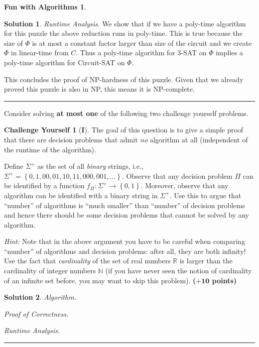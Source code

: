 \documentclass{article}
\theoremstyle{definition}
\newtheorem*{fun}{Fun with Algorithms}
\newtheorem*{challenge}{Challenge Yourself}
\def\fline{\rule{0.75\linewidth}{0.5pt}}
\newcommand{\finishline}{\begin{center}\fline\end{center}}
\newtheorem*{solution*}{Solution}
\newenvironment{solution}{\begin{solution*}}{{\finishline} \end{solution*}}
\newcommand{\grade}[1]{\hfill{\textbf{($\mathbf{#1}$ points)}}}
\newcommand{\set}[1]{\ensuremath{\left\{ #1 \right\}}}
\begin{document}
\begin{fun}
\begin{solution}
	
	\emph{Runtime Analysis.} We show that if we have a poly-time algorithm for this puzzle the above reduction runs in poly-time.  This is true because the size of $\Phi$ is at most a constant factor larger than size of the circuit and we create $\Phi$ in linear-time from $C$.  Thus a poly-time algorithm for 3-SAT on $\Phi$ implies a poly-time algorithm for Circuit-SAT on $\Phi$. 
	
	This concludes the proof of NP-hardness of this puzzle.  Given that we already proved this puzzle is also in NP, this means it is NP-complete. \\
	
\end{solution}

\end{fun}



Consider solving \textbf{at most one} of the following two challenge yourself problems. 

\bigskip

\begin{challenge}[\textbf{I}] 
	The goal of this question is to give a simple proof that there are decision problems that admit \emph{no} algorithm at all (independent of the runtime of the algorithm). 
	
	Define $\Sigma^+$ as the set of all \emph{binary} strings, i.e., $\Sigma^{+} = \set{0,1,00,01,10,11,000,001,\ldots}$. Observe that any decision problem $\Pi$ can be identified by a function $f_{\Pi} : \Sigma^{+} \rightarrow \set{0,1}$. 
	Moreover, observe that any algorithm can be identified with a binary string in $\Sigma^{+}$. Use this to argue that ``number'' of algorithms is ``much smaller'' than ``number'' of decision problems and hence there should be some decision problems
	that cannot be solved by any algorithm. 
	
	\emph{Hint:} Note that in the above argument you have to be careful when comparing ``number'' of algorithms and decision problems: after all, they are both infinity! Use the fact that \emph{cardinality} of the set of real numbers $\mathbb{R}$ is larger than the cardinality of integer numbers $\mathbb{N}$ (if you have never seen the notion of cardinality of an infinite set before, you may want to skip this problem).  \grade{+10}

\begin{solution}
	 
	\emph{Algorithm.}
	
	\emph{Proof of Correctness.}
	
	\emph{Runtime Analysis.}
	
\end{solution}
	
\end{challenge}
\end{document}
